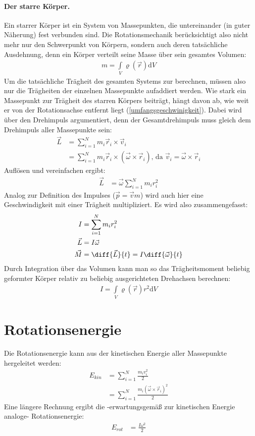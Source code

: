 \paragraph{Der starre Körper.}
Ein starrer Körper ist ein System von Massepunkten, die untereinander (in guter Näherung) fest verbunden sind. Die Rotationsmechanik berücksichtigt also nicht mehr nur den Schwerpunkt von Körpern, sondern auch deren tatsächliche Ausdehnung, denn ein Körper verteilt seine Masse über sein gesamtes Volumen:
\begin{align}
m=\int\limits_{V} \varrho(\vec r)  \mathrm d V
\end{align}
Um die tatsächliche Trägheit des gesamten Systems zur berechnen, müssen also nur die Trägheiten der einzelnen Massepunkte aufaddiert werden. Wie stark ein Massepunkt zur Trägheit des starren Körpers beiträgt, hängt davon ab, wie weit er von der Rotationsachse entfernt liegt (\ref{umfangsgeschwinigkeit}). Dabei wird über den Drehimpuls argumentiert, denn der Gesamtdrehimpuls muss gleich dem Drehimpuls aller Massepunkte sein:
\begin{align}
\vec L &= \sum_{i=1}^{N} m_i \vec r_i \times \vec v_i\\
	   &= \sum_{i=1}^{N} m_i \vec r_i \times (\vec \omega \times \vec r_i)\text{, da } \vec v_i=\vec \omega \times \vec r_i
\end{align}
Auflösen und vereinfachen ergibt:
\begin{align} 
\vec L &= \vec\omega \sum_{i=1}^{N} m_i r_i^2
\end{align}
Analog zur Definition des Impulses ($\vec p=\vec v m$) wird auch hier eine Geschwindigkeit mit einer Trägheit multipliziert. Es wird also zusammengefasst:
\begin{align}
I&=\sum_{i=1}^{N} m_i r_i^2\\
\vec L &= I\vec\omega\\
\label{rotationsbeschleunigung}
\vec M &=\diff{\vec L}{t}= I\diff{\vec\omega}{t}
\end{align}
Durch Integration über das Volumen kann man so das Trägheitsmoment beliebig geformter Körper relativ zu beliebig ausgerichteten Drehachsen berechnen:
\begin{align}
\label{vol-I}
I=\int\limits_{V} \varrho(\vec r)r^2  \mathrm d V
\end{align}

\section{Rotationsenergie}
Die Rotationsenergie kann aus der kinetischen Energie aller Massepunkte hergeleitet werden:
\begin{align}
E_{kin}&=\sum_{i=1}^{N} \frac{m_i v_i^2}{2}\\
	   &=\sum_{i=1}^{N} \frac{m_i (\vec\omega\times\vec r_i)^2}{2}
\end{align}
Eine längere Rechnung ergibt die -erwartungsgemäß zur kinetischen Energie analoge- Rotationsenergie:
\begin{align}
\label{rotationsenergie}
E_{rot}&=\frac{I\omega^2}{2}
\end{align}